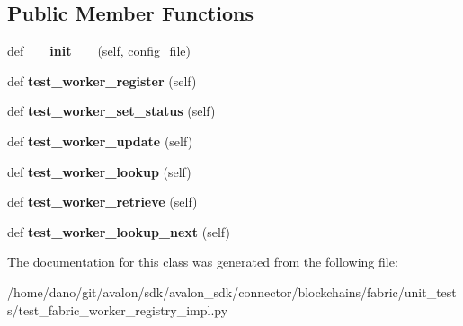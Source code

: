 \subsection*{Public Member Functions}
\begin{DoxyCompactItemize}
\item 
\mbox{\label{classtest__fabric__worker__registry__impl_1_1TestFabricWorkerRegistryImpl_a4087b052f6479629cf750a77565ea987}} 
def {\bfseries \+\_\+\+\_\+init\+\_\+\+\_\+} (self, config\+\_\+file)
\item 
\mbox{\label{classtest__fabric__worker__registry__impl_1_1TestFabricWorkerRegistryImpl_a41b3ae99984e3e433932f089d881eab3}} 
def {\bfseries test\+\_\+worker\+\_\+register} (self)
\item 
\mbox{\label{classtest__fabric__worker__registry__impl_1_1TestFabricWorkerRegistryImpl_aa20f755147fc4851b6837e91519a0d00}} 
def {\bfseries test\+\_\+worker\+\_\+set\+\_\+status} (self)
\item 
\mbox{\label{classtest__fabric__worker__registry__impl_1_1TestFabricWorkerRegistryImpl_ab62df1adfe5a15ad6baacba555d13e43}} 
def {\bfseries test\+\_\+worker\+\_\+update} (self)
\item 
\mbox{\label{classtest__fabric__worker__registry__impl_1_1TestFabricWorkerRegistryImpl_a44aefa9f2e1108c6b7005299a4d6c213}} 
def {\bfseries test\+\_\+worker\+\_\+lookup} (self)
\item 
\mbox{\label{classtest__fabric__worker__registry__impl_1_1TestFabricWorkerRegistryImpl_a59c6c985b3d07b7fc9e33ea401f2065b}} 
def {\bfseries test\+\_\+worker\+\_\+retrieve} (self)
\item 
\mbox{\label{classtest__fabric__worker__registry__impl_1_1TestFabricWorkerRegistryImpl_ab8a5ba88490b108579ceb1eeebc4c190}} 
def {\bfseries test\+\_\+worker\+\_\+lookup\+\_\+next} (self)
\end{DoxyCompactItemize}


The documentation for this class was generated from the following file\+:\begin{DoxyCompactItemize}
\item 
/home/dano/git/avalon/sdk/avalon\+\_\+sdk/connector/blockchains/fabric/unit\+\_\+tests/test\+\_\+fabric\+\_\+worker\+\_\+registry\+\_\+impl.\+py\end{DoxyCompactItemize}
